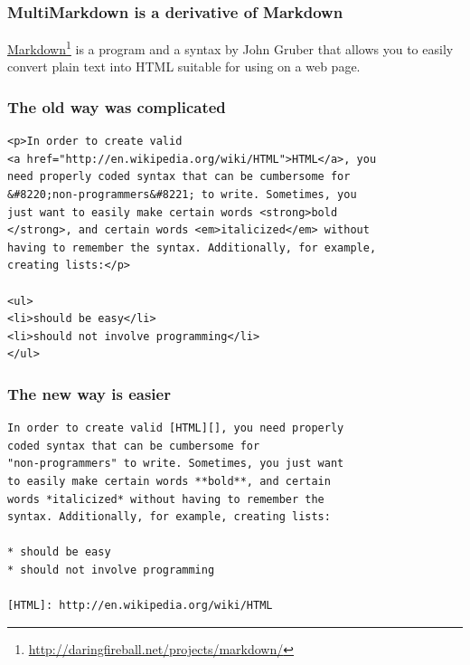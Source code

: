 
\def\mytitle{What is MultiMarkdown?}
\def\subtitle{And why should you care?}
\def\myauthor{Fletcher T. Penney}
\def\affiliation{http:/\slash fletcherpenney.net\slash multimarkdown\slash }
\def\mycopyright{2009-2011 Fletcher T. Penney.  \\
This work is licensed under a Creative Commons License.  \\
http:/\slash creativecommons.org\slash licenses\slash by-sa\slash 2.5\slash }
\def\latexmode{beamer}

\def\theme{keynote-gradient}

\begin{frame}

\frametitle{MultiMarkdown is a derivative of Markdown}
\label{multimarkdownisaderivativeofmarkdown}

\href{http://daringfireball.net/projects/markdown/}{Markdown}\footnote{\href{http://daringfireball.net/projects/markdown/}{http:/\slash daringfireball.net\slash projects\slash markdown\slash }} is a program and a
syntax by John Gruber that allows you to easily convert plain text into HTML
suitable for using on a web page.

\end{frame}

\begin{frame}[fragile]

\frametitle{The old way was complicated}
\label{theoldwaywascomplicated}

\begin{verbatim}
<p>In order to create valid 
<a href="http://en.wikipedia.org/wiki/HTML">HTML</a>, you 
need properly coded syntax that can be cumbersome for 
&#8220;non-programmers&#8221; to write. Sometimes, you
just want to easily make certain words <strong>bold
</strong>, and certain words <em>italicized</em> without
having to remember the syntax. Additionally, for example,
creating lists:</p>

<ul>
<li>should be easy</li>
<li>should not involve programming</li>
</ul>
\end{verbatim}


\end{frame}

\begin{frame}[fragile]

\frametitle{The new way is easier}
\label{thenewwayiseasier}

\begin{verbatim}
In order to create valid [HTML][], you need properly
coded syntax that can be cumbersome for 
"non-programmers" to write. Sometimes, you just want
to easily make certain words **bold**, and certain 
words *italicized* without having to remember the 
syntax. Additionally, for example, creating lists:

* should be easy
* should not involve programming

[HTML]: http://en.wikipedia.org/wiki/HTML
\end{verbatim}


\end{frame}

